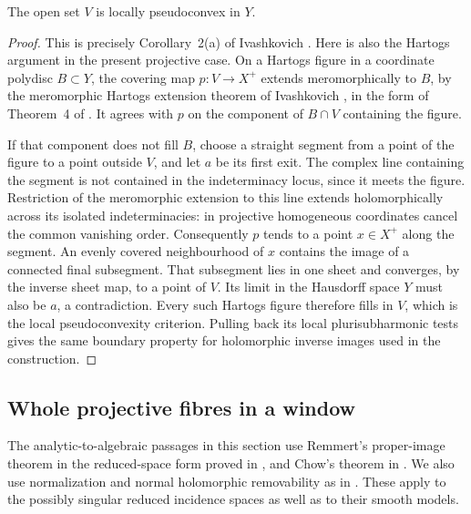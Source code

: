 \begin{lemma}\label{lem:quo-pseudoconvex}
The open set $V$ is locally pseudoconvex in $Y$.
\end{lemma}
\begin{proof}
This is precisely Corollary~2(a) of Ivashkovich \cite{Ivashkovich2008}. Here is also the Hartogs argument in the present projective case. On a Hartogs figure in a coordinate polydisc $B\subset Y$, the covering map $p:V\to X^+$ extends meromorphically to $B$, by the meromorphic Hartogs extension theorem of Ivashkovich \cite{Ivashkovich1992}, in the form of Theorem~4 of \cite{Ivashkovich2008}. It agrees with $p$ on the component of $B\cap V$ containing the figure.

If that component does not fill $B$, choose a straight segment from a point of the figure to a point outside $V$, and let $a$ be its first exit. The complex line containing the segment is not contained in the indeterminacy locus, since it meets the figure. Restriction of the meromorphic extension to this line extends holomorphically across its isolated indeterminacies: in projective homogeneous coordinates cancel the common vanishing order. Consequently $p$ tends to a point $x\in X^+$ along the segment. An evenly covered neighbourhood of $x$ contains the image of a connected final subsegment. That subsegment lies in one sheet and converges, by the inverse sheet map, to a point of $V$. Its limit in the Hausdorff space $Y$ must also be $a$, a contradiction. Every such Hartogs figure therefore fills in $V$, which is the local pseudoconvexity criterion. Pulling back its local plurisubharmonic tests gives the same boundary property for holomorphic inverse images used in the construction.
\end{proof}

\subsection{Whole projective fibres in a window}

The analytic-to-algebraic passages in this section use Remmert's proper-image theorem in the reduced-space form proved in \cite[\S7, Satz~1]{Grauert1960}, and Chow's theorem in \cite[Proposition~13]{Serre1956}. We also use normalization and normal holomorphic removability as in \cite[II.7.3, II.7.12 and Remark~II.7.14]{DemaillyCADG}. These apply to the possibly singular reduced incidence spaces as well as to their smooth models.

